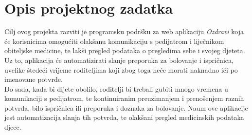 \chapter{Opis projektnog zadatka}
		
		\text Cilj ovog projekta razviti je programsku podršku za web aplikaciju \textit{Ozdravi} koja će korisnicima omogućiti olakšanu komunikaciju s pedijatrom i liječnikom obiteljske medicine, te lakši pregled podataka o pregledima sebe i svojeg djeteta. Uz to, aplikacija će automatizirati slanje preporuka za bolovanje i ispričnica, uvelike štedeći vrijeme roditeljima koji zbog toga neće morati naknadno ići po imenovane potvrde.\\
		Do sada, kada bi dijete obolilo, roditelji bi trebali gubiti mnogo vremena u komunikaciji s pedijatrom, te kontinuiranim preuzimanjem i prenošenjem raznih potvrda, bilo ispričnica ili preporuka i doznaka za bolovanje. Naum ove aplikacije jest automatizacija slanja tih potvrda, te olakšani pregled medicinskih podataka djece. \\
		
